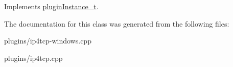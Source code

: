 \-Implements \hyperlink{classpluginInstance__t_a81df28e84fba35ab9d2c2dacc94dfebb}{plugin\-Instance\-\_\-t}.



\-The documentation for this class was generated from the following files\-:\begin{DoxyCompactItemize}
\item 
plugins/ip4tcp-\/windows.\-cpp\item 
plugins/ip4tcp.\-cpp\end{DoxyCompactItemize}
